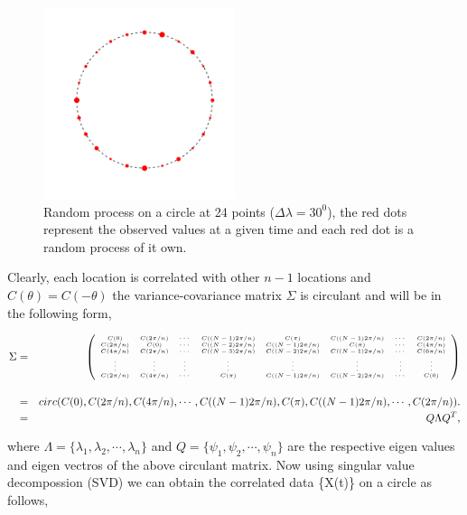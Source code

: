 \begin{figure}
	\centering
	\includegraphics[width=0.5\textwidth]{graphs/process_circle}
	\caption {Random process on a circle at 24 points ($\Delta\lambda = 30^0$), the red dots represent the  observed values at a given time and each red dot is a random process of it own.}
\end{figure}

Clearly, each location is correlated with other $n-1$ locations and $C(\theta) = C(-\theta)$ the variance-covariance matrix $\Sigma$ is circulant and will be in the following form,   


\begin{eqnarray*}
	\Sigma &=& {\tiny \left(\begin{array}{cccccccc}
		C(0)      & C(2\pi/n) & \cdots & C((N-1)2\pi/n) & C(\pi) &  C((N-1)2\pi/n) & \cdots & C(2\pi/n) \\
		C(2\pi/n) & C(0)  & \cdots & C((N-2)2\pi/n) & C((N-1)2\pi/n) &  C(\pi)  & \cdots & C(4\pi/n) \\
		C(4\pi/n) & C(2\pi/n)  & \cdots & C((N-3)2\pi/n) & C((N-2)2\pi/n) &  C((N-1)2\pi/n) & \cdots & C(6\pi/n)\\
		\vdots    &    \vdots  & \vdots  & \vdots  & \vdots  & \vdots  & \vdots  & \vdots  \\
		C(2\pi/n) & C(4\pi/n) & \cdots & C(\pi) &  C((N-1)2\pi/n) & C((N-2)2\pi/n)  & \cdots & C(0) 
		\end{array} \right) }\\
	& & \\
	&=& circ(C(0),C(2\pi/n), C(4\pi/n), \cdots, C((N-1)2\pi/n), C(\pi),  C((N-1)2\pi/n), \cdots, C(2\pi/n)).\\
	&=& Q\Lambda Q^T,
\end{eqnarray*}

where $\Lambda=\{\lambda_1, \lambda_2,\cdots,\lambda_n\}$ and $Q=\{\psi_1, \psi_2,\cdots,\psi_n\}$ are the respective eigen values and eigen vectros of the above circulant matrix. Now using singular value decompossion (SVD) we can obtain the correlated data \{X(t)\} on a circle as follows,

